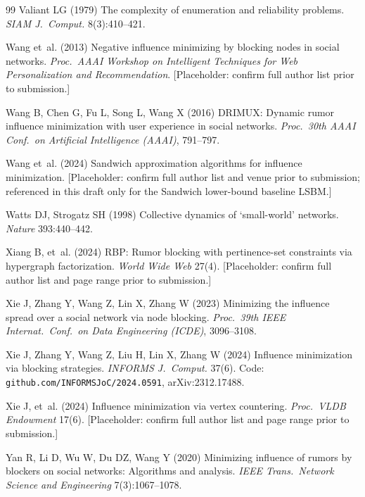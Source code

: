 \documentclass[ijoc,sglanonrev]{informs4}
\begin{document}
\begin{thebibliography}{99}
Valiant LG (1979) The complexity of enumeration and reliability problems.
  \emph{SIAM J.\ Comput.} 8(3):410--421.

Wang et~al. (2013) Negative influence minimizing by blocking nodes in
  social networks. \emph{Proc.\ AAAI Workshop on Intelligent Techniques for
  Web Personalization and Recommendation}. [Placeholder: confirm full
  author list prior to submission.]

Wang B, Chen G, Fu L, Song L, Wang X (2016) DRIMUX: Dynamic rumor influence
  minimization with user experience in social networks. \emph{Proc.\ 30th
  AAAI Conf.\ on Artificial Intelligence (AAAI)}, 791--797.

Wang et~al. (2024) Sandwich approximation algorithms for influence
  minimization. [Placeholder: confirm full author list and venue prior to
  submission; referenced in this draft only for the Sandwich lower-bound
  baseline LSBM.]

Watts DJ, Strogatz SH (1998) Collective dynamics of `small-world'
  networks. \emph{Nature} 393:440--442.

Xiang B, et~al. (2024) RBP: Rumor blocking with pertinence-set constraints
  via hypergraph factorization. \emph{World Wide Web} 27(4). [Placeholder:
  confirm full author list and page range prior to submission.]

Xie J, Zhang Y, Wang Z, Lin X, Zhang W (2023) Minimizing the influence
  spread over a social network via node blocking. \emph{Proc.\ 39th IEEE
  Internat.\ Conf.\ on Data Engineering (ICDE)}, 3096--3108.

Xie J, Zhang Y, Wang Z, Liu H, Lin X, Zhang W (2024) Influence minimization
  via blocking strategies. \emph{INFORMS J.\ Comput.} 37(6). Code:
  \texttt{github.com/INFORMSJoC/2024.0591}, arXiv:2312.17488.

Xie J, et~al. (2024) Influence minimization via vertex countering.
  \emph{Proc.\ VLDB Endowment} 17(6). [Placeholder: confirm full author
  list and page range prior to submission.]

Yan R, Li D, Wu W, Du DZ, Wang Y (2020) Minimizing influence of rumors by
  blockers on social networks: Algorithms and analysis. \emph{IEEE Trans.\
  Network Science and Engineering} 7(3):1067--1078.


\end{thebibliography}
\end{document}
